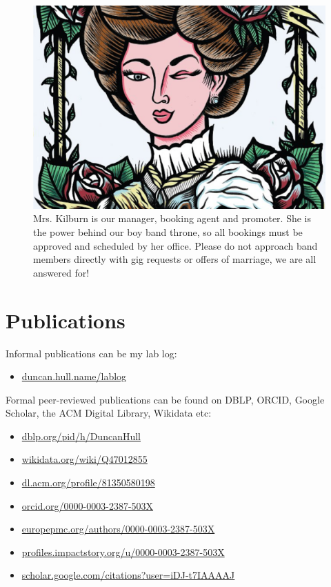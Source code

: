 \documentclass[
  12pt,
]{book}
\providecommand{\tightlist}{%
  \setlength{\itemsep}{0pt}\setlength{\parskip}{0pt}}
\begin{document}
\begin{figure}

{\centering \includegraphics[width=0.7\linewidth]{images/mrs-kilburn} 

}

\caption{Mrs. Kilburn is our manager, booking agent and promoter. She is the power behind our boy band throne, so all bookings must be approved and scheduled by her office. Please do not approach band members directly with gig requests or offers of marriage, we are all answered for!}\label{fig:mrskilburn-fig}
\end{figure}

\hypertarget{publications}{%
\section{Publications}\label{publications}}

Informal publications can be my lab log:

\begin{itemize}
\tightlist
\item
  \href{https://duncan.hull.name/lablog/}{duncan.hull.name/lablog}
\end{itemize}

Formal peer-reviewed publications can be found on DBLP, ORCID, Google Scholar, the ACM Digital Library, Wikidata etc:

\begin{itemize}
\tightlist
\item
  \href{https://dblp.org/pid/h/DuncanHull}{dblp.org/pid/h/DuncanHull}
\item
  \href{https://www.wikidata.org/wiki/Q47012855}{wikidata.org/wiki/Q47012855}
\item
  \href{https://dl.acm.org/profile/81350580198}{dl.acm.org/profile/81350580198}
\item
  \href{https://orcid.org/0000-0003-2387-503X}{orcid.org/0000-0003-2387-503X}
\item
  \href{https://europepmc.org/authors/0000-0003-2387-503X}{europepmc.org/authors/0000-0003-2387-503X}
\item
  \href{https://profiles.impactstory.org/u/0000-0003-2387-503X}{profiles.impactstory.org/u/0000-0003-2387-503X}
\item
  \href{https://scholar.google.com/citations?user=iDJ-t7IAAAAJ}{scholar.google.com/citations?user=iDJ-t7IAAAAJ}
\end{itemize}
\end{document}

